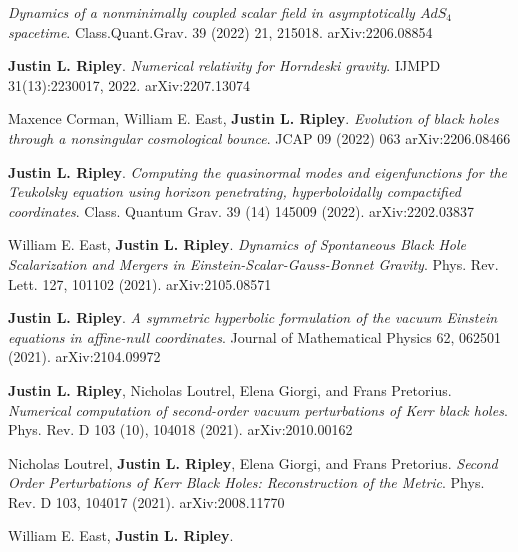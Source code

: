\documentclass{my_cv}
\begin{document}
\begin{etaremune}
   \emph{Dynamics of a nonminimally coupled scalar field in asymptotically
   $AdS_4$ spacetime}.
   Class.Quant.Grav. 39 (2022) 21, 215018.
   arXiv:2206.08854
\item {\bf Justin L. Ripley}. 
   \emph{Numerical relativity for Horndeski gravity}.
   IJMPD 31(13):2230017, 2022.
   arXiv:2207.13074 
\item Maxence Corman, William E. East, {\bf Justin L. Ripley}. 
   \emph{Evolution of black holes through a nonsingular cosmological bounce}.
   JCAP 09 (2022) 063
   arXiv:2206.08466
\item {\bf Justin L. Ripley}. 
   \emph{Computing the quasinormal modes and eigenfunctions for the 
   Teukolsky equation using horizon penetrating, 
   hyperboloidally compactified coordinates}.
   Class. Quantum Grav. 39 (14) 145009 (2022).
   arXiv:2202.03837
\item William E. East, {\bf Justin L. Ripley}. 
   \emph{Dynamics of Spontaneous Black Hole Scalarization and Mergers
   in Einstein-Scalar-Gauss-Bonnet Gravity}.
   Phys. Rev. Lett. 127, 101102 (2021).
   arXiv:2105.08571
\item {\bf Justin L. Ripley}. 
   \emph{A symmetric hyperbolic formulation of the vacuum
      Einstein equations in affine-null coordinates}.
   Journal of Mathematical Physics 62, 062501 (2021).
   arXiv:2104.09972
\item {\bf Justin L. Ripley}, 
   Nicholas Loutrel, Elena Giorgi, and Frans Pretorius. 
   \emph{Numerical computation of second-order vacuum perturbations of
      Kerr black holes}.
   Phys. Rev. D 103 (10), 104018 (2021). 
   arXiv:2010.00162
\item Nicholas Loutrel, {\bf Justin L. Ripley}, 
   Elena Giorgi, and Frans Pretorius. 
   \emph{Second Order Perturbations of Kerr Black Holes: Reconstruction of
      the Metric}.
   Phys. Rev. D 103, 104017 (2021).
   arXiv:2008.11770
\item William E. East, {\bf Justin L. Ripley}. 

\end{etaremune}
\end{document}
